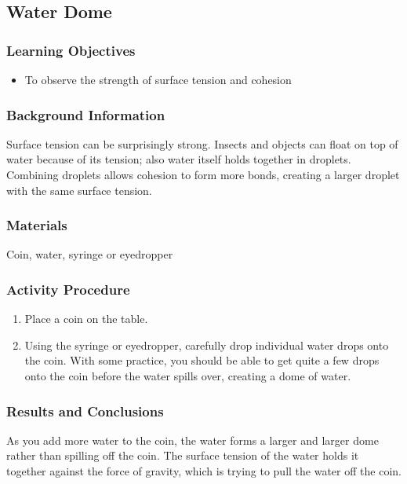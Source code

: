 \subsection*{Water Dome}

\subsubsection*{Learning Objectives}
\begin{itemize}
\item{To observe the strength of surface tension and cohesion}
\end{itemize}

\subsubsection*{Background Information}
Surface tension can be surprisingly strong. Insects and objects can float on top of water because of its tension; also water itself holds together in droplets. Combining droplets allows cohesion to form more bonds, creating a larger droplet with the same surface tension.

\subsubsection*{Materials}
Coin, water, syringe or eyedropper

\subsubsection*{Activity Procedure}
\begin{enumerate}
\item{Place a coin on the table.}
\item{Using the syringe or eyedropper, carefully drop individual water drops onto the coin. With some practice, you should be able to get quite a few drops onto the coin before the water spills over, creating a dome of water.}
\end{enumerate}

\subsubsection*{Results and Conclusions}
As you add more water to the coin, the water forms a larger and larger dome rather than spilling off the coin. The surface tension of the water holds it together against the force of gravity, which is trying to pull the water off the coin. 

